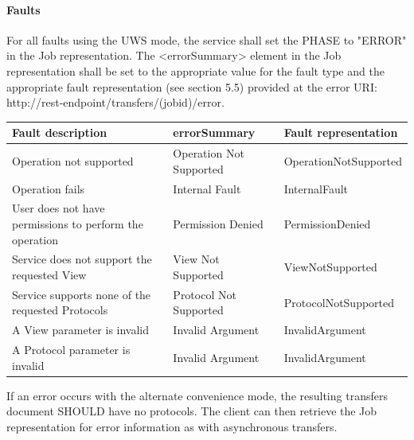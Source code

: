 \documentclass[11pt,a4paper]{ivoa}
\begin{document}
\paragraph{Faults}
For all faults using the UWS mode, the service shall set the PHASE to "ERROR" in the Job representation. The <errorSummary> element in the Job representation shall be set to the appropriate value for the fault type and the appropriate fault representation (see section 5.5) provided at the error URI: http://rest-endpoint/transfers/(jobid)/error.

\vspace{3mm}
\begin{tabular}{ p{5cm} l p{4cm} }
\textbf{Fault description} & \textbf{errorSummary} & \textbf{Fault representation} \\
\hline
Operation not supported & Operation Not Supported & OperationNotSupported \\
\hline
Operation fails & Internal Fault & InternalFault \\
\hline
User does not have permissions to perform the operation	 & Permission Denied & PermissionDenied \\
\hline
Service does not support the requested View & View Not Supported & ViewNotSupported \\
\hline
Service supports none of the requested Protocols & Protocol Not Supported &ProtocolNotSupported \\
\hline
A View parameter is invalid & Invalid Argument & InvalidArgument \\
\hline
A Protocol parameter is invalid & Invalid Argument & InvalidArgument \\
\hline
\end{tabular}
\vspace{3mm}

If an error occurs with the alternate convenience mode, the resulting transfers document SHOULD have no protocols. The client can then retrieve the Job representation for error information as with asynchronous transfers.
\end{document}

